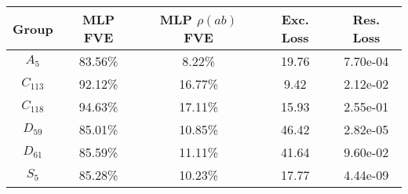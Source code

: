 \begin{tabular}{ccccc}
\toprule
    Group & MLP FVE & MLP $\rho(ab)$ FVE & Exc. Loss & Res. Loss \\
\midrule
  $A_{5}$ & 83.56\% &             8.22\% &     19.76 &  7.70e-04 \\
$C_{113}$ & 92.12\% &            16.77\% &      9.42 &  2.12e-02 \\
$C_{118}$ & 94.63\% &            17.11\% &     15.93 &  2.55e-01 \\
 $D_{59}$ & 85.01\% &            10.85\% &     46.42 &  2.82e-05 \\
 $D_{61}$ & 85.59\% &            11.11\% &     41.64 &  9.60e-02 \\
  $S_{5}$ & 85.28\% &            10.23\% &     17.77 &  4.44e-09 \\
\bottomrule
\end{tabular}
